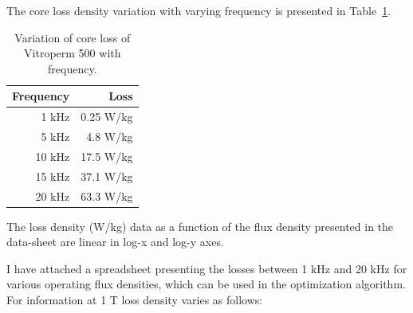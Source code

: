 \documentclass[a4paper, 11pt]{article} %
\begin{document}
The core loss density variation with varying frequency is presented in Table~\ref{core_loss_vs_freq}.
 
\begin{table}[]
\begin{center}
\begin{tabular}{rr}
Frequency & Loss \\
\hline
1 kHz &  0.25 W/kg\\
5 kHz &  4.8 W/kg\\
10 kHz & 17.5 W/kg\\
15 kHz & 37.1 W/kg\\
20 kHz &  63.3 W/kg\\
\hline
\end{tabular} 
\end{center}
\caption{Variation of core loss of Vitroperm 500 with frequency.}
\label{core_loss_vs_freq}
\end{table}

The loss density (W/kg) data as a function of the flux density presented in the data-sheet are linear in log-x and log-y axes.

I have attached a spreadsheet presenting the losses between 1 kHz and 20 kHz for various operating flux densities, which can be used in the optimization algorithm.
For information at 1 T loss density varies as follows:
\end{document}
